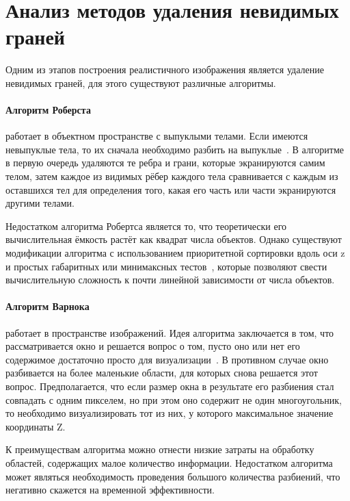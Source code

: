 \section{Анализ методов удаления невидимых граней}
\label{sec:inv_edge}
Одним из этапов построения реалистичного изображения является удаление невидимых граней, для этого существуют различные алгоритмы.
\paragraph{Алгоритм Роберста} работает в объектном пространстве с выпуклыми телами. Если имеются невыпуклые тела, то их сначала необходимо разбить на выпуклые~\cite{rogers}. В алгоритме в первую очередь удаляются те ребра и грани, которые экранируются самим телом, затем каждое из видимых рёбер каждого тела сравнивается с каждым из оставшихся тел для определения того, какая его часть или части экранируются другими телами.
\par Недостатком алгоритма Робертса является то, что теоретически его вычислительная ёмкость растёт как квадрат числа объектов. Однако существуют модификации алгоритма с использованием приоритетной сортировки вдоль оси z и простых габаритных или минимаксных тестов~\cite{rogers}, которые позволяют свести вычислительную сложность к почти линейной зависимости от числа объектов.

\paragraph{Алгоритм Варнока} работает в пространстве изображений. Идея алгоритма заключается в том, что рассматривается окно и решается вопрос о том, пусто оно или нет его содержимое достаточно просто для визуализации~\cite{rogers}. В противном случае окно разбивается на более маленькие области, для которых снова решается этот вопрос. Предполагается, что если размер окна в результате его разбиения стал совпадать с одним пикселем, но при этом оно содержит не один многоугольник, то необходимо визуализировать тот из них, у которого максимальное значение координаты Z.
\par К преимуществам алгоритма можно отнести низкие затраты на обработку областей, содержащих малое количество информации. Недостатком алгоритма может являться необходимость проведения большого количества разбиений, что негативно скажется на временной эффективности.

